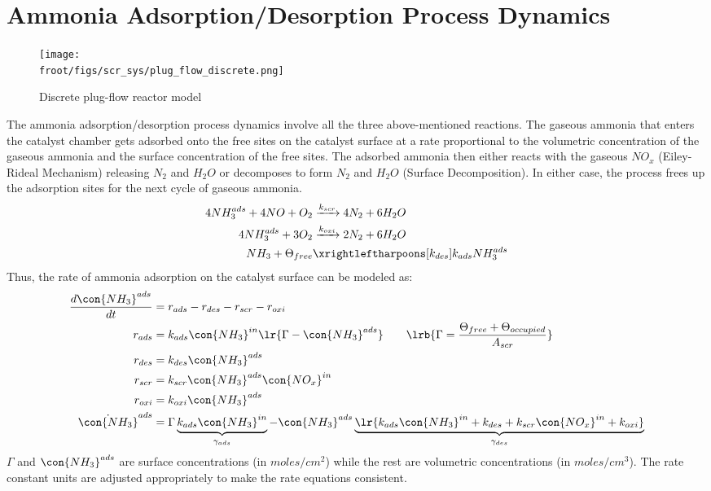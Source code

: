 \newpage
\section{Ammonia Adsorption/Desorption Process Dynamics}
\begin{figure}[H]
    \centering
    \texttt{[image: \\froot/figs/scr\_sys/plug\_flow\_discrete.png]}
    \caption{Discrete plug-flow reactor model}
    \label{fig:plug_flow_discrete}
\end{figure}
The ammonia adsorption/desorption process dynamics involve all the three above-mentioned reactions. The gaseous ammonia
that enters the catalyst chamber gets adsorbed onto the free sites on the catalyst surface at a rate proportional to the
volumetric concentration of the gaseous ammonia and the surface concentration of the free sites. The adsorbed ammonia
then either reacts with the gaseous $NO_x$ (Eiley-Rideal Mechanism) releasing $N_2$ and $H_2O$ or decomposes to form
$N_2$ and $H_2O$ (Surface Decomposition). In either case, the process frees up the adsorption sites for the next cycle
of gaseous ammonia.
\begin{align*}
    4 NH_3 ^{ads} + 4 NO + O_2 &\xrightarrow[]{k_{scr}} 4 N_2 + 6 H_2O \\
    4 NH_3^{ads} + 3 O_2 &\xrightarrow[]{k_{oxi}} 2 N_2 + 6 H_2O \\
    NH_3 + \Theta_{free} &\xrightleftharpoons[k_{des}]{k_{ads}} NH_3^{ads}
\end{align*}
Thus, the rate of ammonia adsorption on the catalyst surface can be modeled as:
\begin{align*}
    \frac{d \con{NH_3}^{ads}}{dt} &= r_{ads} - r_{des} - r_{scr} - r_{oxi}\\
    r_{ads} &= k_{ads} \con{NH_3}^{in} \lr{\Gamma - \con{NH_3}^{ads}} \qquad \lrb{\Gamma = \frac{\Theta_{free} + \Theta_{occupied}}{A_{scr}}}\\
    r_{des} &= k_{des} \con{NH_3}^{ads}\\
    r_{scr} &= k_{scr} \con{NH_3}^{ads} \con{NO_x}^{in}\\
    r_{oxi} &= k_{oxi} \con{NH_3}^{ads}\\
    \dot{\con{NH_3}}^{ads} &= \Gamma \underbrace{k_{ads} \con{NH_3}^{in}}_{\gamma_{ads}} - \con{NH_3}^{ads} \underbrace{\lr{k_{ads} \con{NH_3}^{in} + k_{des} + k_{scr} \con{NO_x}^{in} + k_{oxi}}}_{\gamma_{des}}
\end{align*}
 $\Gamma$ and $\con{NH_3}^{ads}$ are surface concentrations (in $moles/cm^2$) while the rest are volumetric
concentrations (in $moles/cm^3$). The rate constant units are adjusted appropriately to make the rate equations
consistent.

